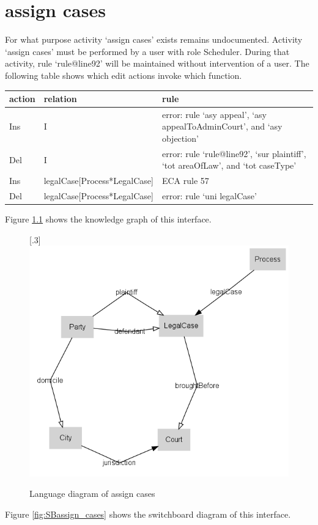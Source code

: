 \documentclass[10pt,a4paper]{report}              %
\theoremstyle{plain}\theorembodyfont{\rmfamily}\newtheorem{definition}{Definition}[section]
\theoremstyle{plain}\theorembodyfont{\rmfamily}\newtheorem{designrule}[definition]{Requirement}
\begin{document}
\chapter{assign cases}\label{chpIfcassign cases}

For what purpose activity `assign cases' exists remains undocumented.
Activity `assign cases' must be performed by a user with role Scheduler.
During that activity, rule `rule@line92'
will be maintained without intervention of a user.
The following table shows which edit actions invoke which function.
\begin{center}
\begin{tabular}{lll}
action & relation & rule\\
\hline
Ins & I & error: rule `asy appeal', `asy appealToAdminCourt', and `asy objection'\\
Del & I & error: rule `rule@line92', `sur plaintiff', `tot areaOfLaw', and `tot caseType'\\
Ins & legalCase{[}Process*LegalCase{]} & ECA rule 57\\
Del & legalCase{[}Process*LegalCase{]} & error: rule `uni legalCase'\\
\end{tabular}
\end{center}

Figure \ref{fig:Servassign_cases} shows the knowledge graph of this interface.

\begin{figure}[htb]
\begin{center}
\scalebox{.3}[.3]{\includegraphics{Servassign_cases}}
\caption{Language diagram of assign cases}
\label{fig:Servassign_cases}
\end{center}
\end{figure}
Figure \ref{fig:SBassign_cases} shows the switchboard diagram of this interface.
\end{document}
